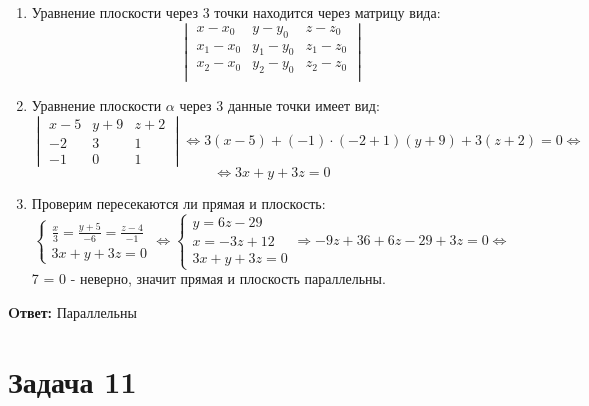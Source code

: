 \documentclass{article}
\begin{document}
\begin{enumerate}
  \item Уравнение плоскости через 3 точки находится через матрицу вида:
    \[
      \begin{vmatrix}
        x-x_0 &y-y_0 &z-z_0\\ 
        x_1-x_0 &y_1-y_0 &z_1-z_0\\ 
        x_2-x_0 &y_2-y_0 &z_2-z_0\\ 
      \end{vmatrix}
    \]
  \item Уравнение плоскости $ \alpha $ через 3 данные точки имеет вид:
    \[
      \begin{vmatrix}
       x-5 &y+9 &z+2\\ 
       -2 &3 &1\\ 
       -1 &0 &1 
      \end{vmatrix}
    \Leftrightarrow 3(x-5) + (-1)\cdot(-2+1)(y+9) + 3(z+2) = 0 \Leftrightarrow\]\[
      \Leftrightarrow 3x+y+3z=0
    \]
  \item Проверим пересекаются ли прямая и плоскость:
    \[
      \begin{cases}
        \frac{x}{3} = \frac{y+5}{-6} = \frac{z-4}{-1}\\
        3x+y+3z=0
      \end{cases}
      \Leftrightarrow
      \begin{cases}
       y = 6z -29\\ 
       x = -3z+12\\ 
       3x + y + 3z = 0 
      \end{cases}
      \Rightarrow
      -9z + 36 +6z - 29 + 3z = 0 \Leftrightarrow
    \]
    7 = 0 - неверно, значит прямая и плоскость параллельны.
\end{enumerate}
\textbf{Oтвет: }Параллельны
\section*{Задача 11}
\end{document}
